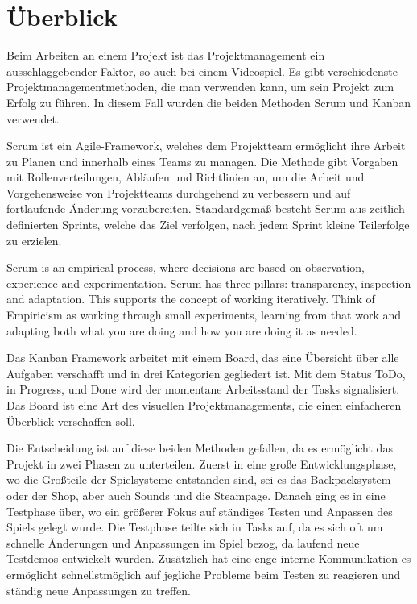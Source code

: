 
\section{Überblick}\label{sec:ueberblick}

\renewcommand{\kapitelautor}{Autor: Nils Hubmann} %

%
Beim Arbeiten an einem Projekt ist das Projektmanagement ein ausschlaggebender Faktor, so auch bei einem Videospiel.
Es gibt verschiedenste Projektmanagementmethoden, die man verwenden kann, um sein Projekt zum Erfolg zu führen.
In diesem Fall wurden die beiden Methoden Scrum und Kanban verwendet.

Scrum ist ein Agile-Framework, welches dem Projektteam ermöglicht ihre Arbeit zu Planen und innerhalb eines Teams zu managen.
Die Methode gibt Vorgaben mit Rollenverteilungen, Abläufen und Richtlinien an, um die Arbeit und Vorgehensweise von Projektteams durchgehend zu verbessern und auf fortlaufende Änderung vorzubereiten.
Standardgemäß besteht Scrum aus zeitlich definierten Sprints, welche das Ziel verfolgen, nach jedem Sprint kleine Teilerfolge zu erzielen. 

\begin{coolQuote}
Scrum is an empirical process, where decisions are based on observation, experience and experimentation.
Scrum has three pillars: transparency, inspection and adaptation. This supports the concept of working iteratively.
Think of Empiricism as working through small experiments, learning from that work and adapting both what you are doing and how you are doing it as needed.
\end{coolQuote}

Das Kanban Framework arbeitet mit einem Board, das eine Übersicht über alle Aufgaben verschafft und in drei Kategorien gegliedert ist.
Mit dem Status ToDo, in Progress, und Done wird der momentane Arbeitsstand der Tasks signalisiert.
Das Board ist eine Art des visuellen Projektmanagements, die einen einfacheren Überblick verschaffen soll.

Die Entscheidung ist auf diese beiden Methoden gefallen, da es ermöglicht das Projekt in zwei Phasen zu unterteilen.
Zuerst in eine große Entwicklungsphase, wo die Großteile der Spielsysteme entstanden sind, sei es das Backpacksystem oder der Shop, aber auch Sounds und die Steampage.
Danach ging es in eine Testphase über, wo ein größerer Fokus auf ständiges Testen und Anpassen des Spiels gelegt wurde.
Die Testphase teilte sich in Tasks auf, da es sich oft um schnelle Änderungen und Anpassungen im Spiel bezog, da laufend neue Testdemos entwickelt wurden.
Zusätzlich hat eine enge interne Kommunikation es ermöglicht schnellstmöglich auf jegliche Probleme beim Testen zu reagieren und ständig neue Anpassungen zu treffen.

\renewcommand{\kapitelautor}{}
